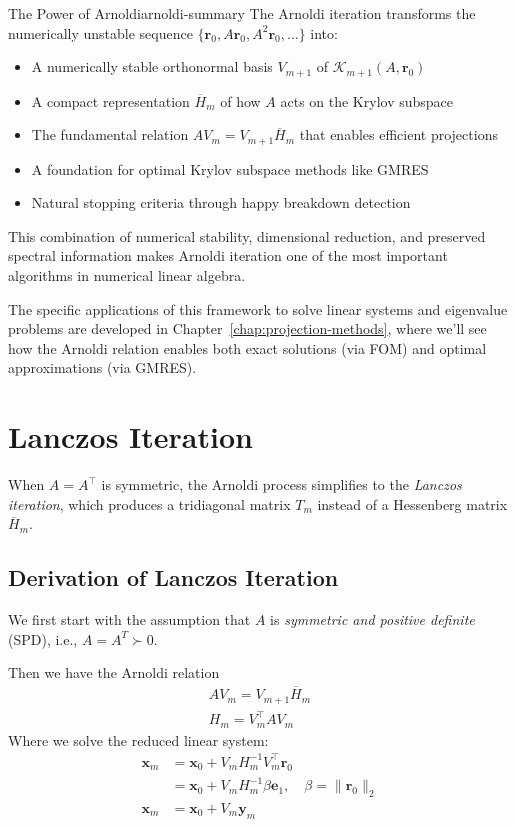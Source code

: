 \documentclass[../../main.tex]{subfiles}
\begin{document}
\begin{summary}{The Power of Arnoldi}{arnoldi-summary}
  The Arnoldi iteration transforms the numerically unstable sequence $\{\mathbf{r}_0, A\mathbf{r}_0, A^2\mathbf{r}_0, \ldots\}$ into:
  \begin{itemize}
    \item A numerically stable orthonormal basis $V_{m+1}$ of $\mathcal{K}_{m+1}(A,\mathbf{r}_0)$
    \item A compact representation $\overline{H}_m$ of how $A$ acts on the Krylov subspace
    \item The fundamental relation $AV_m = V_{m+1}\overline{H}_m$ that enables efficient projections
    \item A foundation for optimal Krylov subspace methods like GMRES
    \item Natural stopping criteria through happy breakdown detection
  \end{itemize}
  This combination of numerical stability, dimensional reduction, and preserved spectral information makes Arnoldi iteration one of the most important algorithms in numerical linear algebra.
\end{summary}

The specific applications of this framework to solve linear systems and eigenvalue problems are developed in Chapter~\ref{chap:projection-methods}, where we'll see how the Arnoldi relation enables both exact solutions (via FOM) and optimal approximations (via GMRES).


\section{Lanczos Iteration}
\label{sec:lanczos-iteration}

When $A=A^\top$ is symmetric, the Arnoldi process simplifies to the \emph{Lanczos iteration}, which produces a tridiagonal matrix $T_m$ instead of a Hessenberg matrix $\overline{H}_m$.

\subsection{Derivation of Lanczos Iteration}
We first start with the assumption that $A$ is \emph{symmetric and positive definite} (SPD), i.e., $A = A^T \succ 0$.

Then we have the Arnoldi relation
\begin{align*}
  AV_m = V_{m+1}\overline{H}_m \\
  H_m = V_m^\top A V_m
\end{align*}
Where we solve the reduced linear system:
\begin{align*}
  \mathbf{x}_m & = \mathbf{x}_0 + V_m H_m^{-1} V_m^\top \mathbf{r}_0                                \\
               & = \mathbf{x}_0 + V_m H_m^{-1} \beta \mathbf{e}_1, \quad \beta = \|\mathbf{r}_0\|_2 \\
  \mathbf{x}_m & = \mathbf{x}_0 + V_m \mathbf{y}_m
\end{align*}
\end{document}
